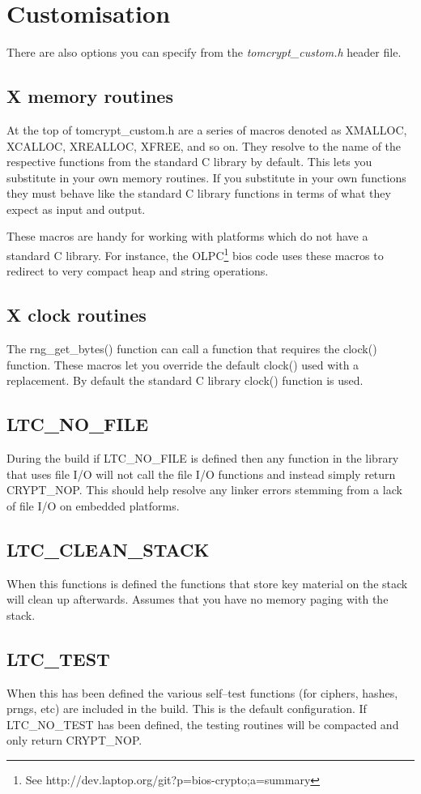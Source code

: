 \documentclass[synpaper]{book}
\newcommand{\mysection}[1]    %
	{                   %
	\section{#1}
   \markboth{\textsf{www.libtom.org}}{\thesection ~ {#1}}
	}
\begin{document}
\mysection{Customisation}
There are also options you can specify from the \textit{tomcrypt\_custom.h} header file.

\subsection{X memory routines}
At the top of tomcrypt\_custom.h are a series of macros denoted as XMALLOC, XCALLOC, XREALLOC, XFREE, and so on.  They resolve to
the name of the respective functions from the standard C library by default.  This lets you substitute in your own memory routines.
If you substitute in your own functions they must behave like the standard C library functions in terms of what they expect as input and
output.

These macros are handy for working with platforms which do not have a standard C library.  For instance, the OLPC\footnote{See http://dev.laptop.org/git?p=bios-crypto;a=summary}
bios code uses these macros to redirect to very compact heap and string operations.

\subsection{X clock routines}
The rng\_get\_bytes() function can call a function that requires the clock() function.  These macros let you override
the default clock() used with a replacement.  By default the standard C library clock() function is used.

\subsection{LTC\_NO\_FILE}
During the build if LTC\_NO\_FILE is defined then any function in the library that uses file I/O will not call the file I/O
functions and instead simply return CRYPT\_NOP.  This should help resolve any linker errors stemming from a lack of
file I/O on embedded platforms.

\subsection{LTC\_CLEAN\_STACK}
When this functions is defined the functions that store key material on the stack will clean up afterwards.
Assumes that you have no memory paging with the stack.

\subsection{LTC\_TEST}
When this has been defined the various self--test functions (for ciphers, hashes, prngs, etc) are included in the build.  This is the default configuration.
If LTC\_NO\_TEST has been defined, the testing routines will be compacted and only return CRYPT\_NOP.
\end{document}
